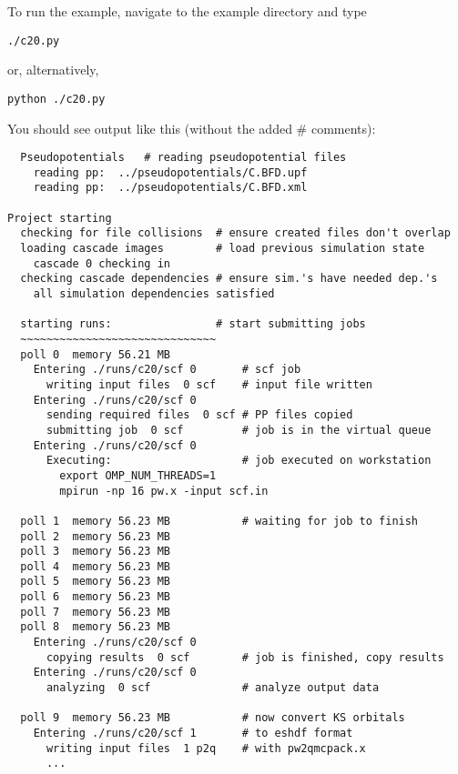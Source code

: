 \documentclass[oneside,11pt]{memoir}
\numberwithin{equation}{section}
\begin{document}
To run the example, navigate to the example directory and type
\begin{shaded}
\begin{verbatim}
./c20.py
\end{verbatim}
\end{shaded}
or, alternatively, 
\begin{shaded}
\begin{verbatim}
python ./c20.py
\end{verbatim}
\end{shaded}

You should see output like this (without the added \# comments):
\begin{shaded}
\begin{verbatim}
  Pseudopotentials   # reading pseudopotential files
    reading pp:  ../pseudopotentials/C.BFD.upf
    reading pp:  ../pseudopotentials/C.BFD.xml

Project starting 
  checking for file collisions  # ensure created files don't overlap 
  loading cascade images        # load previous simulation state 
    cascade 0 checking in 
  checking cascade dependencies # ensure sim.'s have needed dep.'s
    all simulation dependencies satisfied 
  
  starting runs:                # start submitting jobs
  ~~~~~~~~~~~~~~~~~~~~~~~~~~~~~~
  poll 0  memory 56.21 MB 
    Entering ./runs/c20/scf 0       # scf job
      writing input files  0 scf    # input file written
    Entering ./runs/c20/scf 0 
      sending required files  0 scf # PP files copied
      submitting job  0 scf         # job is in the virtual queue
    Entering ./runs/c20/scf 0 
      Executing:                    # job executed on workstation
        export OMP_NUM_THREADS=1
        mpirun -np 16 pw.x -input scf.in 

  poll 1  memory 56.23 MB           # waiting for job to finish
  poll 2  memory 56.23 MB 
  poll 3  memory 56.23 MB 
  poll 4  memory 56.23 MB 
  poll 5  memory 56.23 MB 
  poll 6  memory 56.23 MB 
  poll 7  memory 56.23 MB 
  poll 8  memory 56.23 MB 
    Entering ./runs/c20/scf 0 
      copying results  0 scf        # job is finished, copy results
    Entering ./runs/c20/scf 0 
      analyzing  0 scf              # analyze output data
                                    
  poll 9  memory 56.23 MB           # now convert KS orbitals
    Entering ./runs/c20/scf 1       # to eshdf format
      writing input files  1 p2q    # with pw2qmcpack.x
      ...


\end{verbatim}
\end{shaded}
\end{document}
